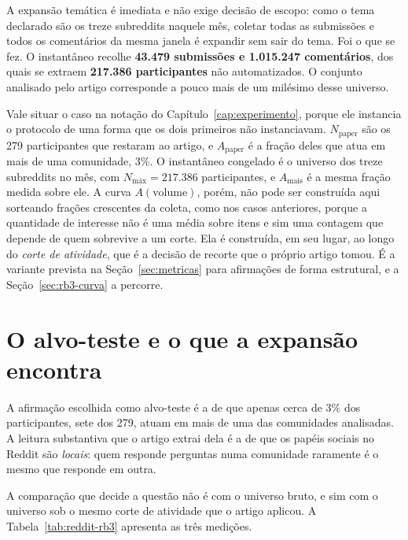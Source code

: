 A expansão temática é imediata e não exige decisão de escopo: como o tema declarado são
os treze subreddits naquele mês, coletar todas as submissões e todos os comentários da
mesma janela é expandir sem sair do tema. Foi o que se fez. O instantâneo recolhe
\textbf{43.479 submissões e 1.015.247 comentários}, dos quais se extraem
\textbf{217.386 participantes} não automatizados. O conjunto analisado pelo artigo
corresponde a pouco mais de um milésimo desse universo.

Vale situar o caso na notação do Capítulo~\ref{cap:experimento}, porque ele instancia
o protocolo de uma forma que os dois primeiros não instanciavam.
$N_{\text{paper}}$ são os 279 participantes que restaram ao artigo, e
$A_{\text{paper}}$ é a fração deles que atua em mais de uma comunidade, 3\%. O
instantâneo congelado é o universo dos treze subreddits no mês, com
$N_{\text{máx}}=217.386$ participantes, e $A_{\text{mais}}$ é a mesma fração medida
sobre ele. A curva $A(\text{volume})$, porém, não pode ser construída aqui sorteando
frações crescentes da coleta, como nos casos anteriores, porque a quantidade de
interesse não é uma média sobre itens e sim uma contagem que depende de quem
sobrevive a um corte. Ela é construída, em seu lugar, ao longo do \emph{corte de
atividade}, que é a decisão de recorte que o próprio artigo tomou. É a variante
prevista na Seção~\ref{sec:metricas} para afirmações de forma estrutural, e a
Seção~\ref{sec:rb3-curva} a percorre.

\section{O alvo-teste e o que a expansão encontra}

A afirmação escolhida como alvo-teste é a de que apenas cerca de 3\% dos participantes,
sete dos 279, atuam em mais de uma das comunidades analisadas. A leitura substantiva que
o artigo extrai dela é a de que os papéis sociais no Reddit são \emph{locais}: quem
responde perguntas numa comunidade raramente é o mesmo que responde em outra.

A comparação que decide a questão não é com o universo bruto, e sim com o universo sob
o mesmo corte de atividade que o artigo aplicou. A Tabela~\ref{tab:reddit-rb3} apresenta
as três medições.

